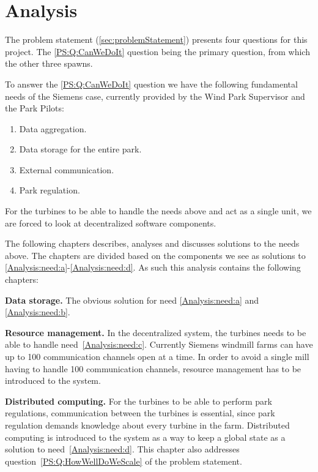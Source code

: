 \chapter{Analysis}

The problem statement (\cref{sec:problemStatement}) presents four questions for this project. The \ref{PS:Q:CanWeDoIt} question being the primary question, from which the other three spawns. 

To answer the \ref{PS:Q:CanWeDoIt} question we have the following fundamental needs of the Siemens case, currently provided by the Wind Park Supervisor and the Park Pilots:
\begin{enumerate}[label=\textbf{\alph*.}, ref=\textit{\alph*}]
\item \label{Analysis:need:a} Data aggregation.
\item \label{Analysis:need:b} Data storage for the entire park.
\item \label{Analysis:need:c} External communication.
\item \label{Analysis:need:d} Park regulation.
\end{enumerate}

For the turbines to be able to handle the needs above and act as a single unit, we are forced to look at decentralized software components. 

The following chapters describes, analyses and discusses solutions to the needs above. The chapters are divided based on the components we see as solutions to \ref{Analysis:need:a}-\ref{Analysis:need:d}. As such this analysis contains the following chapters:

\begin{description}
\item{\textbf{Data storage.}} The obvious solution for need \ref{Analysis:need:a} and \ref{Analysis:need:b}.
\item{\textbf{Resource management.}} In the decentralized system, the turbines needs to be able to handle need~\ref{Analysis:need:c}. Currently Siemens windmill farms can have up to 100 communication channels open at a time. In order to avoid a single mill having to handle 100 communication channels, resource management has to be introduced to the system.
\item{\textbf{Distributed computing.}} For the turbines to be able to perform park regulations, communication between the turbines is essential, since park regulation demands knowledge about every turbine in the farm. Distributed computing is introduced to the system as a way to keep a global state as a solution to need~\ref{Analysis:need:d}. This chapter also addresses question~\ref{PS:Q:HowWellDoWeScale} of the problem statement.
\end{description}

